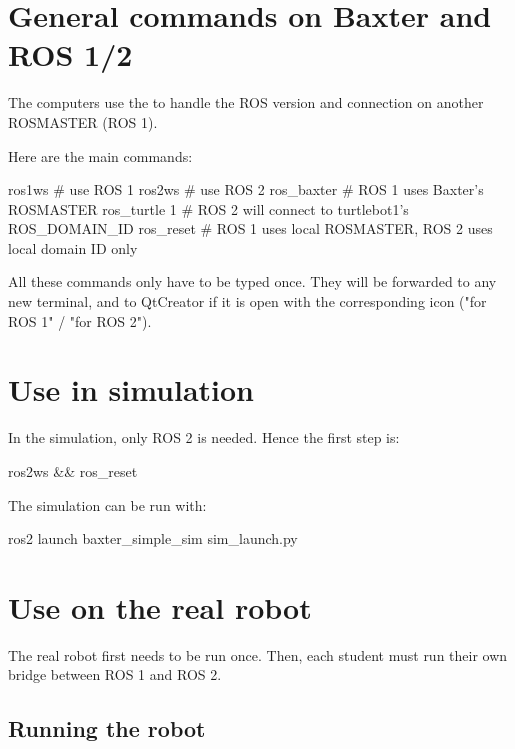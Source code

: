 \documentclass{ecnreport}
\author{O. Kermorgant}
\begin{document}


\section{General commands on Baxter and ROS 1/2}

The computers use the  to handle the ROS version and connection on another ROSMASTER (ROS 1).

Here are the main commands:
\begin{bashcodelarge}
ros1ws  # use ROS 1
ros2ws # use ROS 2
ros_baxter # ROS 1 uses Baxter's ROSMASTER
ros_turtle 1  # ROS 2 will connect to turtlebot1's ROS_DOMAIN_ID
ros_reset # ROS 1 uses local ROSMASTER, ROS 2 uses local domain ID only
\end{bashcodelarge}

All these commands only have to be typed once. They will be forwarded to any new terminal, and to QtCreator if it is open with the corresponding icon ("for ROS 1" / "for ROS 2").

\section{Use in simulation}

In the simulation, only ROS 2 is needed. Hence the first step is:
\begin{bashcodelarge}
ros2ws && ros_reset
\end{bashcodelarge}

The simulation can be run with:
\begin{bashcodelarge}
 ros2 launch baxter_simple_sim sim_launch.py
\end{bashcodelarge}

\section{Use on the real robot}

The real robot first needs to be run once. Then, each student must run their own bridge between ROS 1 and ROS 2.

\subsection{Running the robot}
\end{document}
